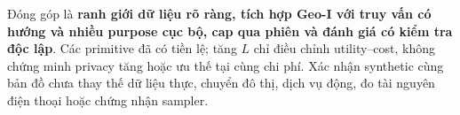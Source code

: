 Đóng góp là \textbf{ranh giới dữ liệu rõ ràng, tích hợp Geo-I với truy vấn có hướng và nhiều purpose cục bộ, cap qua phiên và đánh giá có kiểm tra độc lập}. Các primitive đã có tiền lệ; tăng $L$ chỉ điều chỉnh utility--cost, không chứng minh privacy tăng hoặc ưu thế tại cùng chi phí. Xác nhận synthetic cùng bản đồ chưa thay thế dữ liệu thực, chuyển đô thị, dịch vụ động, đo tài nguyên điện thoại hoặc chứng nhận sampler.

